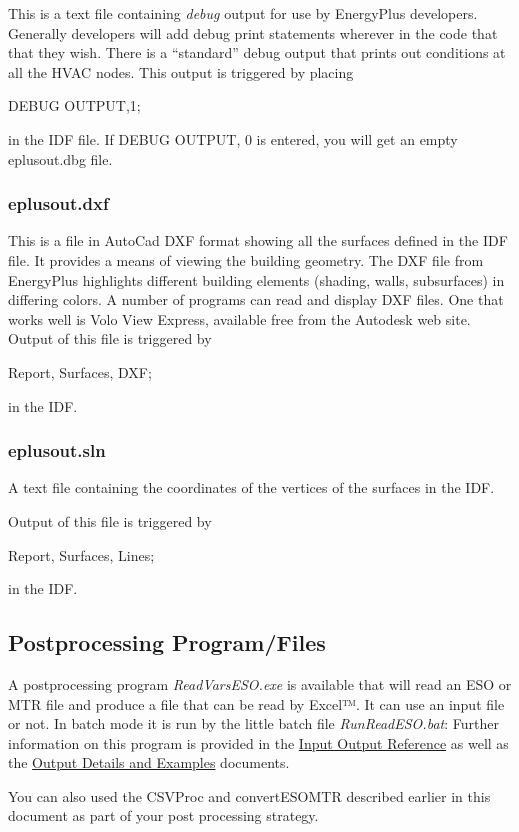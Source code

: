 This is a text file containing \emph{debug} output for use by EnergyPlus developers. Generally developers will add debug print statements wherever in the code that that they wish. There is a ``standard'' debug output that prints out conditions at all the HVAC nodes. This output is triggered by placing

DEBUG OUTPUT,1;

in the IDF file. If DEBUG OUTPUT, 0 is entered, you will get an empty eplusout.dbg file.

\subsubsection{eplusout.dxf}\label{eplusout.dxf}

This is a file in AutoCad DXF format showing all the surfaces defined in the IDF file. It provides a means of viewing the building geometry. The DXF file from EnergyPlus highlights different building elements (shading, walls, subsurfaces) in differing colors. A number of programs can read and display DXF files. One that works well is Volo View Express, available free from the Autodesk web site. Output of this file is triggered by

Report, Surfaces, DXF;

in the IDF.

\subsubsection{eplusout.sln}\label{eplusout.sln}

A text file containing the coordinates of the vertices of the surfaces in the IDF.

Output of this file is triggered by

Report, Surfaces, Lines;

in the IDF.

\subsection{Postprocessing Program/Files}\label{postprocessing-programfiles-000}

A postprocessing program \emph{ReadVarsESO.exe} is available that will read an ESO or MTR file and produce a file that can be read by Excel™. It can use an input file or not. In batch mode it is run by the little batch file \emph{RunReadESO.bat}: Further information on this program is provided in the \href{file:///E:/Docs4PDFs/InputOutputReference.pdf}{Input Output Reference} as well as the \href{file:///E:/Docs4PDFs/OutputDetailsAndExamples.pdf}{Output Details and Examples} documents.

You can also used the CSVProc and convertESOMTR described earlier in this document as part of your post processing strategy.
